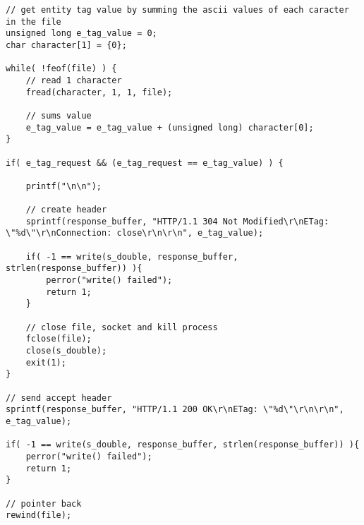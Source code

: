 \begin{lstlisting}
// get entity tag value by summing the ascii values of each caracter in the file
unsigned long e_tag_value = 0;
char character[1] = {0};

while( !feof(file) ) {
    // read 1 character
    fread(character, 1, 1, file);

    // sums value
    e_tag_value = e_tag_value + (unsigned long) character[0];
}

if( e_tag_request && (e_tag_request == e_tag_value) ) {
    
    printf("\n\n");

    // create header
    sprintf(response_buffer, "HTTP/1.1 304 Not Modified\r\nETag: \"%d\"\r\nConnection: close\r\n\r\n", e_tag_value);

    if( -1 == write(s_double, response_buffer, strlen(response_buffer)) ){
        perror("write() failed");
        return 1;
    }

    // close file, socket and kill process
    fclose(file);
    close(s_double);
    exit(1);
}

// send accept header
sprintf(response_buffer, "HTTP/1.1 200 OK\r\nETag: \"%d\"\r\n\r\n", e_tag_value);

if( -1 == write(s_double, response_buffer, strlen(response_buffer)) ){
    perror("write() failed");
    return 1;
}

// pointer back
rewind(file);
\end{lstlisting}